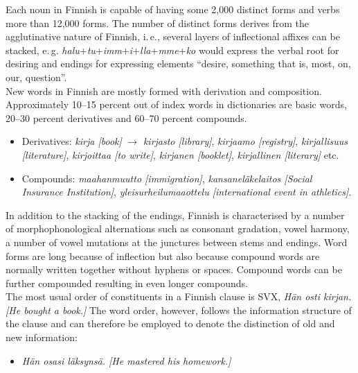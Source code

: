 \begin{multicols}{2}
Each noun in Finnish is capable of having some 2,000 distinct forms
and verbs more than 12,000 forms. The number of distinct forms derives
from the agglutinative nature of Finnish, i.\,e., several layers of
inflectional affixes can be stacked,
e.\,g. \textit{halu}+\textit{tu}+\textit{imm}+\textit{i}+\textit{lla}+\textit{mme}+\textit{ko}
would express the verbal root for desiring and endings for expressing
elements “desire, something that is, most, on, our, question”.\\
New words in Finnish are mostly formed with derivation and composition.
Approximately 10–15 percent out of index words in dictionaries are basic words,
20–30 percent derivatives and 60–70 percent compounds.
\begin{itemize}
\item Derivatives:
   \textit{\foreignlanguage{finnish}{\textit{kirja}} [book]} $\to$
   \textit{\foreignlanguage{finnish}{\textit{kirjasto}} [library]},
   \textit{\foreignlanguage{finnish}{\textit{kirjaamo}} [registry]},
   \textit{\foreignlanguage{finnish}{\textit{kirjallisuus}} [literature]},
   \textit{\foreignlanguage{finnish}{\textit{kirjoittaa}} [to write]},
   \textit{\foreignlanguage{finnish}{\textit{kirjanen}} [booklet]},
   \textit{\foreignlanguage{finnish}{\textit{kirjallinen}} [literary]} etc.

\item Compounds:
   \textit{\foreignlanguage{finnish}{\textit{maahanmuutto}} [immigration]},
   \textit{\foreignlanguage{finnish}{\textit{kansaneläkelaitos}}
           [Social Insurance Institution]},
   \textit{\foreignlanguage{finnish}{\textit{yleisurheilumaaottelu}}
           [international event in athletics]}.
\end{itemize}
In addition to the stacking of the endings, Finnish is characterised by a
number of morphophonological alternations such as consonant gradation, vowel
harmony, a number of vowel mutations at the junctures between stems and
endings. Word forms are long because of inflection but also because compound
words are normally written together without hyphens or spaces. Compound words
can be further compounded resulting in even longer compounds.\\
The most usual order of constituents in a Finnish clause is SVX,
\textit{\foreignlanguage{finnish}{\textit{Hän osti kirjan.}}
        [He bought a book.]}
The word order, however, follows the
information structure of the clause and can therefore be employed to denote the
distinction of old and new information:
\begin{itemize}
\item \textit{\foreignlanguage{finnish}{\textit{Hän osasi läksynsä.}}
              [He mastered his homework.]}


\end{itemize}
\end{multicols}
